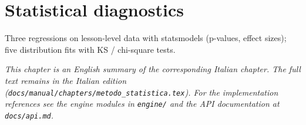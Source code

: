 \chapter{Statistical diagnostics}
\label{ch:metodo_statistica_en}

Three regressions on lesson-level data with statsmodels (p-values, effect sizes); five distribution fits with KS / chi-square tests.

\medskip
\noindent
\textit{This chapter is an English summary of the corresponding Italian chapter. The full text remains in the Italian edition (\texttt{docs/manual/chapters/metodo\_statistica.tex}). For the implementation references see the engine modules in \texttt{engine/} and the API documentation at \texttt{docs/api.md}.}

